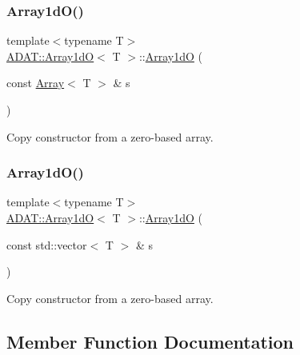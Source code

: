 \subsubsection{\texorpdfstring{Array1dO()}{Array1dO()}\hspace{0.1cm}{\footnotesize\ttfamily [14/15]}}
{\footnotesize\ttfamily template$<$typename T$>$ \\
\mbox{\hyperlink{classADAT_1_1Array1dO}{A\+D\+A\+T\+::\+Array1dO}}$<$ T $>$\+::\mbox{\hyperlink{classADAT_1_1Array1dO}{Array1dO}} (\begin{DoxyParamCaption}\item[{const \mbox{\hyperlink{classXMLArray_1_1Array}{Array}}$<$ T $>$ \&}]{s }\end{DoxyParamCaption})\hspace{0.3cm}{\ttfamily [inline]}}



Copy constructor from a zero-\/based array. 

\mbox{\label{classADAT_1_1Array1dO_aad6c2df87d1dc941fd561fd74d181ddc}} 
\subsubsection{\texorpdfstring{Array1dO()}{Array1dO()}\hspace{0.1cm}{\footnotesize\ttfamily [15/15]}}
{\footnotesize\ttfamily template$<$typename T$>$ \\
\mbox{\hyperlink{classADAT_1_1Array1dO}{A\+D\+A\+T\+::\+Array1dO}}$<$ T $>$\+::\mbox{\hyperlink{classADAT_1_1Array1dO}{Array1dO}} (\begin{DoxyParamCaption}\item[{const std\+::vector$<$ T $>$ \&}]{s }\end{DoxyParamCaption})\hspace{0.3cm}{\ttfamily [inline]}}



Copy constructor from a zero-\/based array. 



\subsection{Member Function Documentation}
\mbox{\label{classADAT_1_1Array1dO_a387ca64e93f23d140b38bd42e81d05a8}} 
